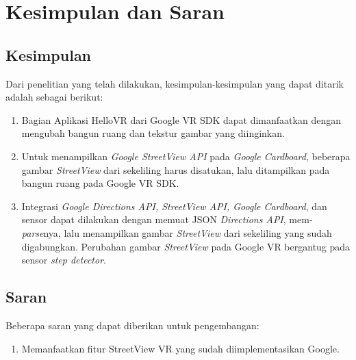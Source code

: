 \chapter{Kesimpulan dan Saran}
\label{chap:conc}

\section{Kesimpulan}
Dari penelitian yang telah dilakukan, kesimpulan-kesimpulan yang dapat ditarik adalah sebagai berikut:

\begin{enumerate}
	\item Bagian Aplikasi HelloVR dari Google VR SDK dapat dimanfaatkan dengan mengubah bangun ruang dan tekstur gambar yang diinginkan.
	
	\item Untuk menampilkan \textit{Google StreetView API} pada \textit{Google Cardboard}, beberapa gambar \textit{StreetView} dari sekeliling harus disatukan, lalu ditampilkan pada bangun ruang pada Google VR SDK.
	
	\item Integrasi \textit{Google Directions API, StreetView API, Google Cardboard}, dan sensor dapat dilakukan dengan memuat JSON \textit{Directions API}, mem-\textit{parse}nya, lalu menampilkan gambar \textit{StreetView} dari sekeliling yang sudah digabungkan. Perubahan gambar \textit{StreetView} pada Google VR bergantug pada sensor \textit{step detector}.  
\end{enumerate}

\section{Saran}
Beberapa saran yang dapat diberikan untuk pengembangan:

\begin{enumerate}
	\item Memanfaatkan fitur StreetView VR yang sudah diimplementasikan Google. 
	
	
\end{enumerate}
